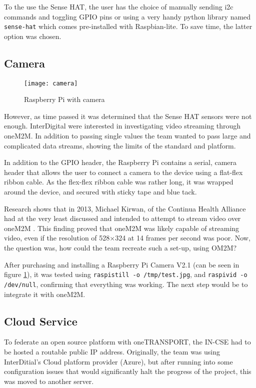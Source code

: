 To the use the Sense HAT, the user has the choice of manually sending i2c commands and toggling GPIO pins or using a very handy python library named \lstinline{sense-hat} \cite{RaspberryPiFoundation2017SenseHAT} which comes pre-installed with Raspbian-lite. To save time, the latter option was chosen.

\subsection{Camera}

\begin{figure}[H]
  \centering
  \texttt{[image: camera]}
  \caption[Raspberry Pi with camera]{Raspberry Pi with camera}
  \label{fig:camera}
\end{figure}

However, as time passed it was determined that the Sense HAT sensors were not enough. InterDigital were interested in investigating video streaming through oneM2M. In addition to passing single values the team wanted to pass large and complicated data streams, showing the limits of the standard and platform.

In addition to the GPIO header, the Raspberry Pi contains a serial, camera header that allows the user to connect a camera to the device using a flat-flex ribbon cable. As the flex-flex ribbon cable was rather long, it was wrapped around the device, and secured with sticky tape and blue tack.

Research shows that in 2013, Michael Kirwan, of the Continua Health Alliance had at the very least discussed and intended to attempt to stream video over oneM2M \cite{MichaelKirwan2013VideoNetwork.}. This finding proved that oneM2M was likely capable of streaming video, even if the resolution of 528$\times$324 at 14 frames per second was poor. Now, the question was, how could the team recreate such a set-up, using OM2M?

After purchasing and installing a Raspberry Pi Camera V2.1 (can be seen in figure \ref{fig:camera}), it was tested using \lstinline{raspistill -o /tmp/test.jpg}, and \lstinline{raspivid -o /dev/null}, confirming that everything was working. The next step would be to integrate it with oneM2M. 

\subsection{Cloud Service}

To federate an open source platform with oneTRANSPORT, the IN-CSE had to be hosted a routable public IP address. Originally, the team was using InterDitial's Cloud platform provider (Azure), but after running into some configuration issues that would significantly halt the progress of the project, this was moved to another server. 

